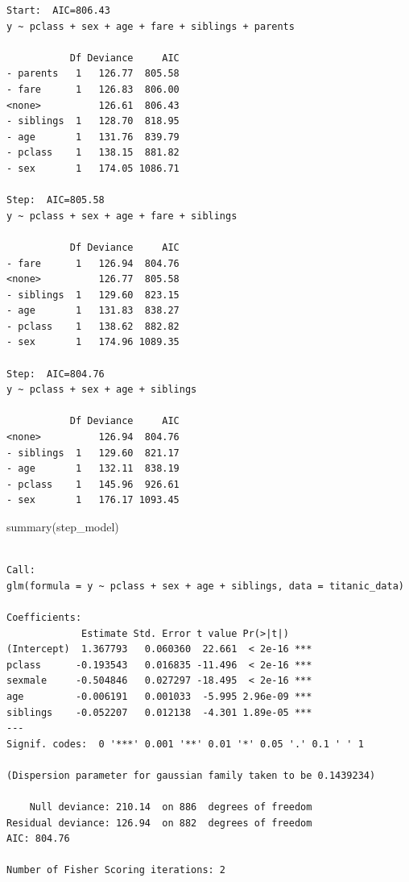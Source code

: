 \documentclass[
  letterpaper,
  DIV=11,
  numbers=noendperiod]{scrartcl}
\newenvironment{Shaded}{\begin{snugshade}}{\end{snugshade}}
\newcommand{\AttributeTok}[1]{\textcolor[rgb]{0.40,0.45,0.13}{#1}}
\newcommand{\CommentTok}[1]{\textcolor[rgb]{0.37,0.37,0.37}{#1}}
\newcommand{\FunctionTok}[1]{\textcolor[rgb]{0.28,0.35,0.67}{#1}}
\newcommand{\NormalTok}[1]{\textcolor[rgb]{0.00,0.23,0.31}{#1}}
\newcommand{\OtherTok}[1]{\textcolor[rgb]{0.00,0.23,0.31}{#1}}
\newcommand{\SpecialCharTok}[1]{\textcolor[rgb]{0.37,0.37,0.37}{#1}}
\newcommand{\StringTok}[1]{\textcolor[rgb]{0.13,0.47,0.30}{#1}}
\begin{document}
\begin{verbatim}
Start:  AIC=806.43
y ~ pclass + sex + age + fare + siblings + parents

           Df Deviance     AIC
- parents   1   126.77  805.58
- fare      1   126.83  806.00
<none>          126.61  806.43
- siblings  1   128.70  818.95
- age       1   131.76  839.79
- pclass    1   138.15  881.82
- sex       1   174.05 1086.71

Step:  AIC=805.58
y ~ pclass + sex + age + fare + siblings

           Df Deviance     AIC
- fare      1   126.94  804.76
<none>          126.77  805.58
- siblings  1   129.60  823.15
- age       1   131.83  838.27
- pclass    1   138.62  882.82
- sex       1   174.96 1089.35

Step:  AIC=804.76
y ~ pclass + sex + age + siblings

           Df Deviance     AIC
<none>          126.94  804.76
- siblings  1   129.60  821.17
- age       1   132.11  838.19
- pclass    1   145.96  926.61
- sex       1   176.17 1093.45
\end{verbatim}

\begin{Shaded}
\begin{Highlighting}[]
\FunctionTok{summary}\NormalTok{(step\_model)}
\end{Highlighting}
\end{Shaded}

\begin{verbatim}

Call:
glm(formula = y ~ pclass + sex + age + siblings, data = titanic_data)

Coefficients:
             Estimate Std. Error t value Pr(>|t|)    
(Intercept)  1.367793   0.060360  22.661  < 2e-16 ***
pclass      -0.193543   0.016835 -11.496  < 2e-16 ***
sexmale     -0.504846   0.027297 -18.495  < 2e-16 ***
age         -0.006191   0.001033  -5.995 2.96e-09 ***
siblings    -0.052207   0.012138  -4.301 1.89e-05 ***
---
Signif. codes:  0 '***' 0.001 '**' 0.01 '*' 0.05 '.' 0.1 ' ' 1

(Dispersion parameter for gaussian family taken to be 0.1439234)

    Null deviance: 210.14  on 886  degrees of freedom
Residual deviance: 126.94  on 882  degrees of freedom
AIC: 804.76

Number of Fisher Scoring iterations: 2
\end{verbatim}

\begin{Shaded}
\end{Shaded}
\end{document}
